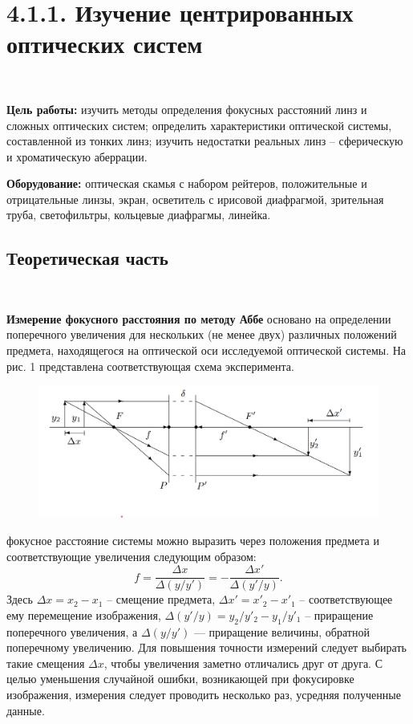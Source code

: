 \documentclass[12pt]{article}
\begin{document}
    \section*{4.1.1. Изучение центрированных оптических систем}
    \ \par
    \textbf{Цель работы:} изучить методы определения фокусных расстояний
    линз и сложных оптических систем; определить характеристики оптической системы, составленной из тонких линз; изучить недостатки
    реальных линз -- сферическую и хроматическую аберрации.


    \textbf{Оборудование:} оптическая скамья с набором рейтеров, положительные и отрицательные линзы, экран, осветитель с ирисовой
    диафрагмой, зрительная труба, светофильтры, кольцевые диафрагмы, линейка.


    \subsection*{Теоретическая часть}
    \ \par
    \textbf{Измерение фокусного расстояния по методу Аббе} основано на определении поперечного увеличения для нескольких (не менее двух) различных положений предмета,
    находящегося на оптической оси исследуемой оптической системы.
    На рис. 1 представлена соответствующая схема эксперимента.
    \begin{figure}[h]
        \centering
        \includegraphics[width=0.6\linewidth]{pic/1}
        \caption{}
        \label{fig:1}
    \end{figure}
    фокусное расстояние системы можно выразить через положения предмета и соответствующие увеличения следующим образом:
    \[f = \frac{\Delta x}{\Delta (y/y')} = -\frac{\Delta x'}{\Delta(y'/y)}.\]
    Здесь $\Delta x = x_2 - x_1$ -- смещение предмета, $\Delta x' = x'_2 - x'_1$ --
    соответствующее ему перемещение изображения, $\Delta (y'/y) = y_2/y'_2 - y_1/y'_1$ --
    приращение поперечного увеличения, а $\Delta (y/y')$ — приращение величины,
    обратной поперечному увеличению.
    Для повышения точности измерений следует выбирать такие смещения $\Delta x$, чтобы увеличения заметно
    отличались друг от друга.
    С целью уменьшения случайной ошибки, возникающей при фокусировке изображения,
    измерения следует проводить несколько раз, усредняя полученные данные.
\end{document}
